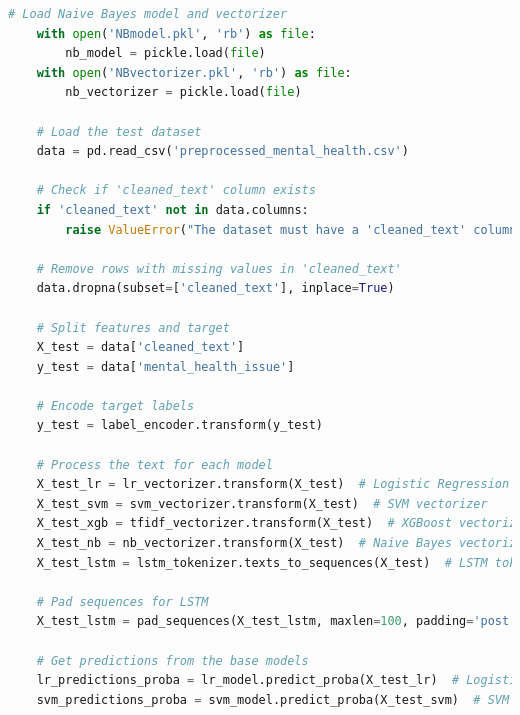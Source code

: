 \begin{tcolorbox}[colback=gray!5!white, colframe=gray!80!black, boxrule=0.5pt, title=Retraining the Ensemble Model]
    \begin{lstlisting}[language=Python]      
    # Load Naive Bayes model and vectorizer
    with open('NBmodel.pkl', 'rb') as file:
        nb_model = pickle.load(file)
    with open('NBvectorizer.pkl', 'rb') as file:
        nb_vectorizer = pickle.load(file)

    # Load the test dataset
    data = pd.read_csv('preprocessed_mental_health.csv')

    # Check if 'cleaned_text' column exists
    if 'cleaned_text' not in data.columns:
        raise ValueError("The dataset must have a 'cleaned_text' column.")

    # Remove rows with missing values in 'cleaned_text'
    data.dropna(subset=['cleaned_text'], inplace=True)

    # Split features and target
    X_test = data['cleaned_text']
    y_test = data['mental_health_issue']

    # Encode target labels
    y_test = label_encoder.transform(y_test)

    # Process the text for each model
    X_test_lr = lr_vectorizer.transform(X_test)  # Logistic Regression vectorizer
    X_test_svm = svm_vectorizer.transform(X_test)  # SVM vectorizer
    X_test_xgb = tfidf_vectorizer.transform(X_test)  # XGBoost vectorizer
    X_test_nb = nb_vectorizer.transform(X_test)  # Naive Bayes vectorizer
    X_test_lstm = lstm_tokenizer.texts_to_sequences(X_test)  # LSTM tokenizer

    # Pad sequences for LSTM
    X_test_lstm = pad_sequences(X_test_lstm, maxlen=100, padding='post', truncating='post')

    # Get predictions from the base models
    lr_predictions_proba = lr_model.predict_proba(X_test_lr)  # Logistic Regression probabilities
    svm_predictions_proba = svm_model.predict_proba(X_test_svm)  # SVM probabilities
    \end{lstlisting}
\end{tcolorbox}
